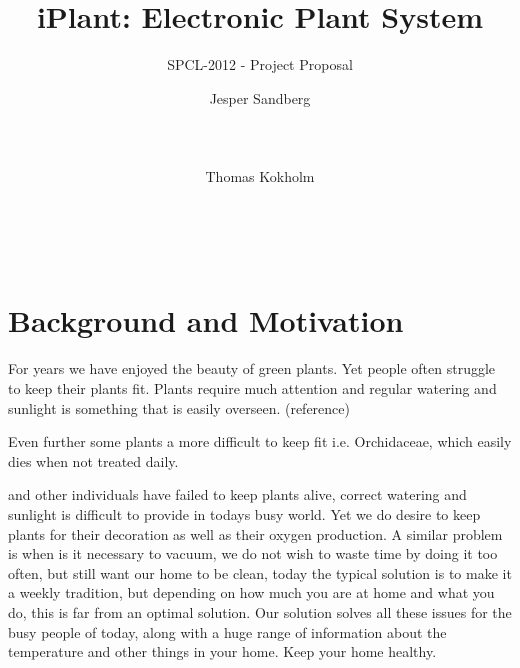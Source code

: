 \documentclass{ubicomp2012}
\begin{document}
\setlength{\paperheight}{11in}
\setlength{\paperwidth}{8.5in}
\setlength{\pdfpageheight}{\paperheight}
\setlength{\pdfpagewidth}{\paperwidth}




\title{iPlant: Electronic Plant System}
\subtitle{SPCL-2012 - Project Proposal}
\author{
  \alignauthor Jesper Sandberg\\
    \\
    \\
    \\
 \alignauthor Thomas Kokholm\\
    \\
    \\
    \\
      }
\maketitle

\section{Background and Motivation}
For years we have enjoyed the beauty of green plants. Yet people often struggle to keep their plants fit. Plants require much attention and regular watering and sunlight is something that is easily overseen. (reference)

Even further some plants a more difficult to keep fit i.e. Orchidaceae, which easily dies when not treated daily.

 
 and other individuals have failed to keep plants alive, correct watering and sunlight is difficult to provide
in todays busy world. Yet we do desire to keep plants for their decoration as well as their oxygen production. A similar problem
is when is it necessary to vacuum, we do not wish to waste time by doing it too often, but still want our home to be clean,
today the typical solution is to make it a weekly tradition, but depending on how much you are at home and what you do, this is
far from an optimal solution. Our solution solves all these issues for the busy people of today, along with a huge range of
information about the temperature and other things in your home. Keep your home healthy.
\end{document}
